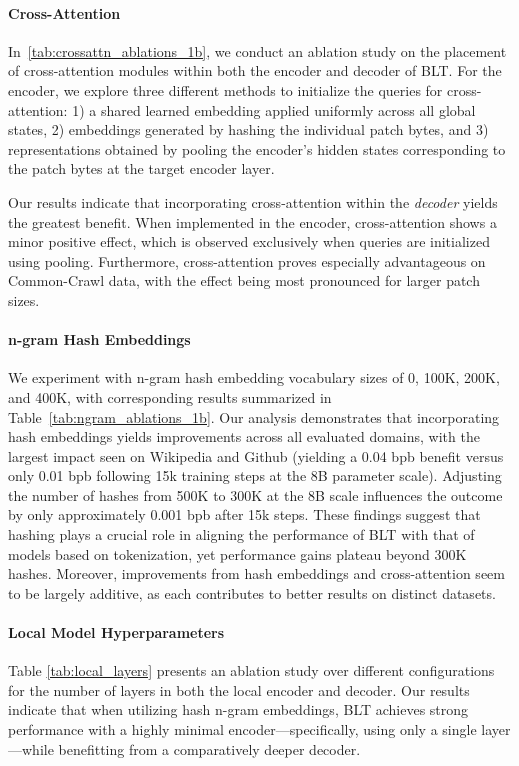 \paragraph{Cross-Attention} 
In~\autoref{tab:crossattn_ablations_1b}, we conduct an ablation study on the placement of cross-attention modules within both the encoder and decoder of {\textsc BLT}. For the encoder, we explore three different methods to initialize the queries for cross-attention: 1) a shared learned embedding applied uniformly across all global states, 2) embeddings generated by hashing the individual patch bytes, and 3) representations obtained by pooling the encoder’s hidden states corresponding to the patch bytes at the target encoder layer.

Our results indicate that incorporating cross-attention within the \textit{decoder} yields the greatest benefit. When implemented in the encoder, cross-attention shows a minor positive effect, which is observed exclusively when queries are initialized using pooling. Furthermore, cross-attention proves especially advantageous on Common-Crawl data, with the effect being most pronounced for larger patch sizes.

\paragraph{n-gram Hash Embeddings} 

We experiment with n-gram hash embedding vocabulary sizes of 0, 100K, 200K, and 400K, with corresponding results summarized in Table~\ref{tab:ngram_ablations_1b}. Our analysis demonstrates that incorporating hash embeddings yields improvements across all evaluated domains, with the largest impact seen on Wikipedia and Github (yielding a 0.04 bpb benefit versus only 0.01 bpb following 15k training steps at the 8B parameter scale). Adjusting the number of hashes from 500K to 300K at the 8B scale influences the outcome by only approximately 0.001 bpb after 15k steps. These findings suggest that hashing plays a crucial role in aligning the performance of {\textsc BLT} with that of models based on tokenization, yet performance gains plateau beyond 300K hashes. Moreover, improvements from hash embeddings and cross-attention seem to be largely additive, as each contributes to better results on distinct datasets.

\paragraph{Local Model Hyperparameters} Table \ref{tab:local_layers} presents an ablation study over different configurations for the number of layers in both the local encoder and decoder. Our results indicate that when utilizing hash n-gram embeddings, {\textsc BLT} achieves strong performance with a highly minimal encoder—specifically, using only a single layer—while benefitting from a comparatively deeper decoder.

